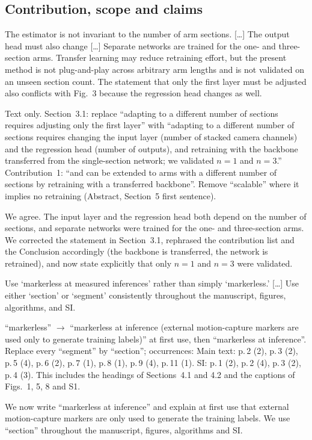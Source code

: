 \documentclass[10pt,a4paper]{article}
\begin{document}
\subsection{Contribution, scope and claims}\label{sec:claims}
\begin{rev}
The estimator is not invariant to the number of arm sections. [\dots] The output head must also change [\dots] Separate networks are trained for the one- and three-section arms. Transfer learning may reduce retraining effort, but the present method is not plug-and-play across arbitrary arm lengths and is not validated on an unseen section count. The statement that only the first layer must be adjusted also conflicts with Fig.~3 because the regression head changes as well.
\end{rev}
\begin{todo}
Text only. Section~3.1: replace ``adapting to a different number of sections requires adjusting only the first layer'' with ``adapting to a different number of sections requires changing the input layer (number of stacked camera channels) and the regression head (number of outputs), and retraining with the backbone transferred from the single-section network; we validated $n=1$ and $n=3$.'' Contribution~1: ``and can be extended to arms with a different number of sections by retraining with a transferred backbone''. Remove ``scalable'' where it implies no retraining (Abstract, Section~5 first sentence).
\end{todo}
\begin{resp}
We agree. The input layer and the regression head both depend on the number of sections, and separate networks were trained for the one- and three-section arms. We corrected the statement in Section~3.1, rephrased the contribution list and the Conclusion accordingly (the backbone is transferred, the network is retrained), and now state explicitly that only $n=1$ and $n=3$ were validated.
\end{resp}

\begin{rev}
Use `markerless at measured inferences' rather than simply `markerless.' [\dots] Use either `section' or `segment' consistently throughout the manuscript, figures, algorithms, and SI.
\end{rev}
\begin{todo}
``markerless'' $\rightarrow$ ``markerless at inference (external motion-capture markers are used only to generate training labels)'' at first use, then ``markerless at inference''. Replace every ``segment'' by ``section''; occurrences: Main text: p.\,2 (2), p.\,3 (2), p.\,5 (4), p.\,6 (2), p.\,7 (1), p.\,8 (1), p.\,9 (4), p.\,11 (1). SI: p.\,1 (2), p.\,2 (4), p.\,3 (2), p.\,4 (3). This includes the headings of Sections~4.1 and 4.2 and the captions of Figs.~1, 5, 8 and S1.
\end{todo}
\begin{resp}
We now write ``markerless at inference'' and explain at first use that external motion-capture markers are only used to generate the training labels. We use ``section'' throughout the manuscript, figures, algorithms and SI.
\end{resp}
\end{document}
